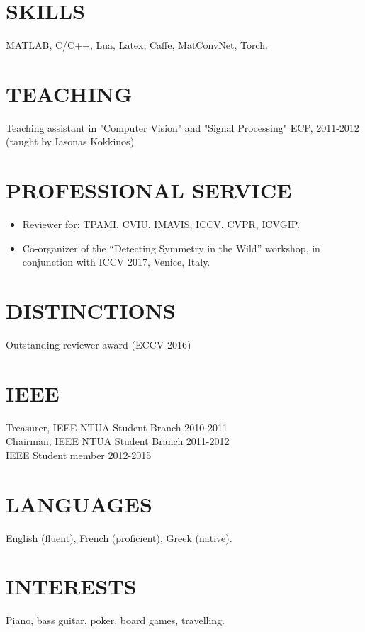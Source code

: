 \documentclass[margin]{res}
\begin{document}
\begin{resume}
\section{SKILLS} MATLAB, C/C++, Lua, Latex, Caffe, MatConvNet, Torch. 
\newline

\section{TEACHING} Teaching assistant in "Computer Vision" and "Signal Processing" \hfill ECP, 2011-2012 \\(taught by Iasonas Kokkinos)  	
\section{PROFESSIONAL SERVICE} 
\begin{itemize}
\item Reviewer for: TPAMI, CVIU, IMAVIS, ICCV, CVPR, ICVGIP.
\item Co-organizer of the ``Detecting Symmetry in the Wild'' workshop, in conjunction with ICCV 2017, Venice, Italy.
\end{itemize}

\section{DISTINCTIONS} Outstanding reviewer award (ECCV 2016)

\section{IEEE}
		Treasurer, IEEE NTUA Student Branch \hfill 2010-2011 \\
	    Chairman, IEEE NTUA Student Branch \hfill 2011-2012 \\
	    IEEE Student member	\hfill 2012-2015
 
 \section{LANGUAGES} English (fluent), French (proficient), Greek (native).
 \section{INTERESTS} Piano, bass guitar, poker, board games, travelling.
 
 
\end{resume}
\end{document}
